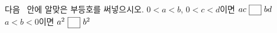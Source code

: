 다음 \blank\ 안에 알맞은 부등호를 써넣으시오.
 $0<a<b$, $0<c<d$이면 \quad $ac\ \blank\ bd$
 $a<b<0$이면 \quad $a^2\ \blank\ b^2$
